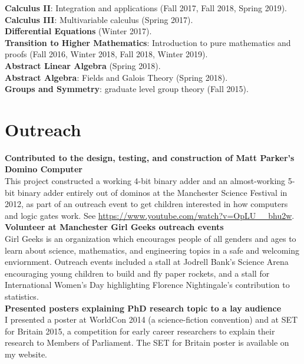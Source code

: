 \documentclass[margin]{res} %
\begin{document}
\begin{resume}
{\bf Calculus II}: Integration and applications (Fall 2017, Fall 2018, Spring 2019).\\[0.3em]
{\bf Calculus III}: Multivariable calculus (Spring 2017).\\[0.3em]
{\bf Differential Equations} (Winter 2017).\\[0.3em]
{\bf Transition to Higher Mathematics}: Introduction to pure mathematics and proofs (Fall 2016, Winter 2018, Fall 2018, Winter 2019).\\[0.3em]
{\bf Abstract Linear Algebra} (Spring 2018).\\[0.3em]
{\bf Abstract Algebra}: Fields and Galois Theory (Spring 2018).\\[0.3em]
{\bf Groups and Symmetry}: graduate level group theory (Fall 2015).


\section{\sc Outreach}

{\bf Contributed to the design, testing, and construction of Matt Parker's Domino Computer} \\
This project constructed a working 4-bit binary adder and an almost-working 5-bit binary adder entirely out of dominos at the Manchester Science Festival in 2012, as part of an outreach event to get children interested in how computers and logic gates work. See \url{https://www.youtube.com/watch?v=OpLU__bhu2w}.\\[-1.5em]

{\bf Volunteer at Manchester Girl Geeks outreach events}\\
Girl Geeks is an organization which encourages people of all genders and ages to learn about science, mathematics, and engineering topics in a safe and welcoming enviornment. Outreach events included a stall at Jodrell Bank's Science Arena encouraging young children to build and fly paper rockets, and a stall for International Women's Day highlighting Florence Nightingale's contribution to statistics.\\[-1.5em]

{\bf Presented posters explaining PhD research topic to a lay audience}\\
I presented a poster at WorldCon 2014 (a science-fiction convention) and at SET for Britain 2015, a competition for early career researchers to explain their research to Members of Parliament. The SET for Britain poster is available on my website.\\[-1.5em]


\end{resume}
\end{document}
